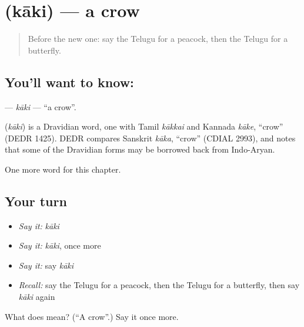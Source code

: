 \section[\texorpdfstring{\te{కాకి} (kāki)}{కాకి (kāki)}]{ (kāki) — a crow}

\label{lesson:TE-C125-kaki}



\begin{quote}
Before the new one: say the Telugu for a peacock, then the Telugu for a butterfly.
\end{quote}

\subsection*{You'll want to know: }
\textbf{} — \emph{kāki} — \textquotedblleft{}a crow\textquotedblright{}.

\begin{cousinweb}
\textbf{} (\emph{kāki}) is a Dravidian word, one with Tamil \emph{kākkai} and Kannada \emph{kāke}, \textquotedblleft{}crow\textquotedblright{} (DEDR 1425). DEDR compares Sanskrit \emph{kāka}, \textquotedblleft{}crow\textquotedblright{} (CDIAL 2993), and notes that some of the Dravidian forms may be borrowed back from Indo-Aryan.
\end{cousinweb}

\begin{grammarlens}[title={What you've built}]
One more word for this chapter.
\end{grammarlens}

\subsection*{Your turn}
\begin{itemize}
\raggedright
  \item \emph{Say it:} \emph{kāki}
  \item \emph{Say it:} \emph{kāki}, once more
  \item \emph{Say it:} say \emph{kāki}
  \item \emph{Recall:} say the Telugu for a peacock, then the Telugu for a butterfly, then say \emph{kāki} again
\end{itemize}

\begin{tcolorbox}[breakable,colback=teal!4,colframe=teal!35!black,title={Before you move on}]
What does  mean? (\textquotedblleft{}A crow\textquotedblright{}.) Say it once more.
\end{tcolorbox}
